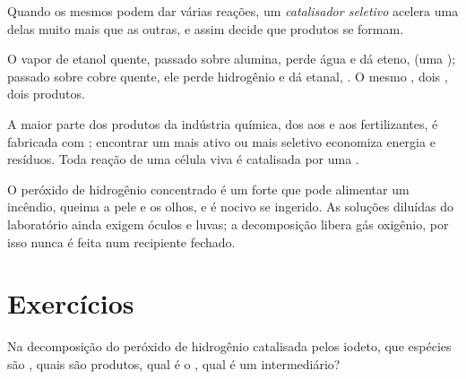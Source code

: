 \begin{definition}\label{def:g12:catalysis:selective}
Quando os mesmos  podem dar várias reações, um
\emph{catalisador seletivo} acelera uma delas
muito mais que as outras, e assim decide que produtos se formam.
\end{definition}

\begin{example}\label{ex:g12:catalysis:ethanol}
O vapor de etanol quente, passado sobre alumina, perde água e dá eteno,
 (uma ); passado sobre cobre quente,
ele perde hidrogênio e dá etanal, . O mesmo
, dois , dois produtos.
\end{example}

\begin{remark}\label{rem:g12:catalysis:everywhere}
A maior parte dos produtos da indústria química, dos  aos
 e aos fertilizantes, é fabricada com ; encontrar
um  mais ativo ou mais seletivo economiza energia e
resíduos. Toda reação de uma célula viva é catalisada por uma .
\end{remark}

\begin{safety}{}
O peróxido de hidrogênio concentrado é um  forte que pode
alimentar um incêndio, queima a pele e os olhos, e é nocivo se
ingerido. As soluções diluídas do laboratório ainda exigem óculos e
luvas; a decomposição libera gás oxigênio, por isso nunca é feita num
recipiente fechado.
\end{safety}

\section{Exercícios}


\begin{exercise}[$\star$]\label{exo:g12:catalysis:1}
Na decomposição do peróxido de hidrogênio catalisada pelos  iodeto,
que espécies são , quais são produtos, qual é o ,
qual é um intermediário?
\end{exercise}

